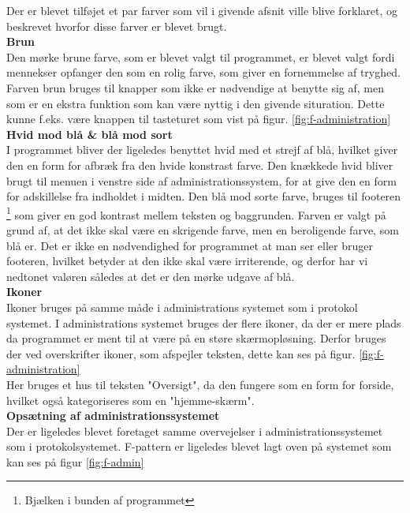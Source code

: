 
Der er blevet tilføjet et par farver som vil i givende afsnit ville blive forklaret, og beskrevet hvorfor disse farver er blevet brugt.\\

{\bf Brun}\\
Den mørke brune farve, som er blevet valgt til programmet, er blevet valgt fordi mennekser opfanger den som en rolig farve, som giver en fornemmelse af tryghed. Farven brun bruges til knapper som ikke er nødvendige at benytte sig af, men som er en ekstra funktion som kan være nyttig i den givende situration. Dette kunne f.eks. være knappen til tasteturet som vist på figur. \ref{fig:f-administration}\\

{\bf Hvid mod blå \& blå mod sort}\\
I programmet bliver der ligeledes benyttet hvid med et strejf af blå, hvilket giver den en form for afbræk fra den hvide konstrast farve. Den knækkede hvid bliver brugt til menuen i venstre side af administrationssystem, for at give den en form for adskillelse fra indholdet i midten. Den blå mod sorte farve, bruges til footeren \footnote{Bjælken i bunden af programmet} som giver en god kontrast mellem teksten og baggrunden. Farven er valgt på grund af, at det ikke skal være en skrigende farve, men en beroligende farve, som blå er. Det er ikke en nødvendighed for programmet at man ser eller bruger footeren, hvilket betyder at den ikke skal være irriterende, og derfor har vi nedtonet valøren således at det er den mørke udgave af blå.\\

\textbf{Ikoner}\\
Ikoner bruges på samme måde i administrations systemet som i protokol systemet.
I administrations systemet bruges der flere ikoner, da der er mere plads da programmet er ment til at være på en støre skærmopløsning. Derfor bruges der ved overskrifter ikoner, som afspejler teksten, dette kan ses på figur. \ref{fig:f-administration}\\
Her bruges et hus til teksten "Oversigt", da den fungere som en form for forside, hvilket også kategoriseres som en "hjemme-skærm".\\

\textbf{Opsætning af administrationssystemet}\\
Der er ligeledes blevet foretaget samme overvejelser i administrationssystemet som i protokolsystemet. F-pattern er ligeledes blevet lagt oven på systemet som kan ses på figur \ref{fig:f-admin}


